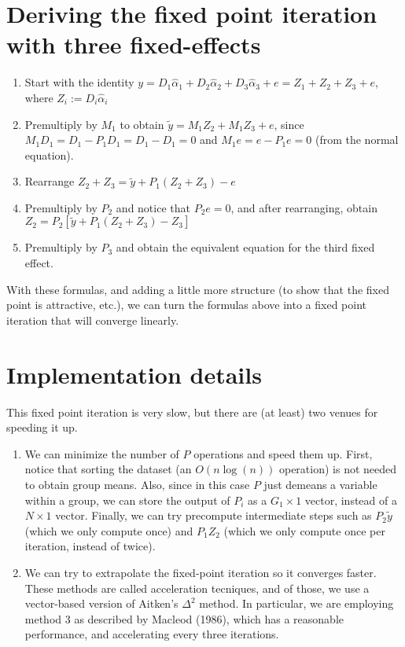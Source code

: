 \documentclass[11pt]{article}
\begin{document}
\section{Deriving the fixed point iteration with three fixed-effects}

\begin{enumerate}
    \item Start with the identity $y = D_1\hat\alpha_1 + D_2\hat\alpha_2 + D_3\hat\alpha_3 + e = Z_1 + Z_2 + Z_3 + e$, where $Z_i := D_i\hat\alpha_i$
    \item Premultiply by $M_1$ to obtain $\tilde{y} = M_1Z_2 + M_1Z_3 + e$, since $M_1D_1 = D_1 - P_1D_1 = D_1 - D_1 = 0$ and $M_1e = e - P_1 e = 0$ (from the normal equation).
    \item Rearrange $Z_2 + Z_3 = \tilde{y} + P_1 \left( Z_2 + Z_3 \right) - e$
    \item Premultiply by $P_2$ and notice that $P_2 e = 0$, and after rearranging,
    obtain $Z_2 = P_2 \left[ \tilde{y} + P_1 \left( Z_2 + Z_3 \right) - Z_3 \right]$
    \item Premultiply by $P_3$ and obtain the equivalent equation for the third fixed effect.
\end{enumerate}

With these formulas, and adding a little more structure (to show that the fixed point is attractive, etc.), we can turn the formulas above into a fixed point iteration that will converge linearly.

\section{Implementation details}

This fixed point iteration is very slow, but there are (at least) two venues for speeding it up.

\begin{enumerate}
    \item We can minimize the number of $P$ operations and speed them up. First, notice that sorting the dataset (an $O(n \log(n))$ operation) is not needed to obtain group means. Also, since in this case $P$ just demeans a variable within a group, we can store the output of $P_i$ as a $G_1 \times 1$ vector, instead of a $N \times 1$ vector. Finally, we can try precompute intermediate steps such as $P_2 \tilde{y}$ (which we only compute once) and $P_1Z_2$ (which we only compute once per iteration, instead of twice).
    \item We can try to extrapolate the fixed-point iteration so it converges faster. These methods are called acceleration tecniques, and of those, we use a vector-based version of Aitken's $\Delta^2$ method. In particular, we are employing method 3 as described by Macleod (1986), which has a reasonable performance, and accelerating every three iterations.
\end{enumerate}
\end{document}
